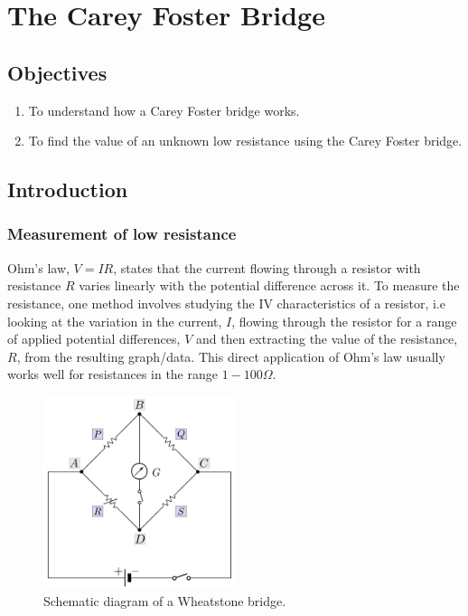 \chapter{The Carey Foster Bridge}

\section*{Objectives}

\begin{enumerate}
\item To understand how a Carey Foster bridge works.
\item To find the value of an unknown low resistance using the Carey Foster bridge.
\end{enumerate}


\section*{Introduction}
\subsection*{Measurement of low resistance} 
Ohm's law, $V=IR$, states that the current flowing through a resistor with resistance $R$ varies linearly with the potential difference across it.
To measure the resistance, one method involves studying the IV characteristics of a resistor, i.e looking at the variation in the current, $I$, flowing through the resistor for a range of applied potential differences, $V$ and then extracting the value of the resistance, $R$, from the resulting graph/data. This direct application of Ohm's law usually works well for resistances in the range $1-100 \Omega$. 

\begin{figure}[!htb]
    \centering
    \includegraphics[width=0.5\textwidth]{figs/wheatstone.png}
    \caption{Schematic diagram of a Wheatstone bridge.}
    \label{fig:wheatstone}
\end{figure}

